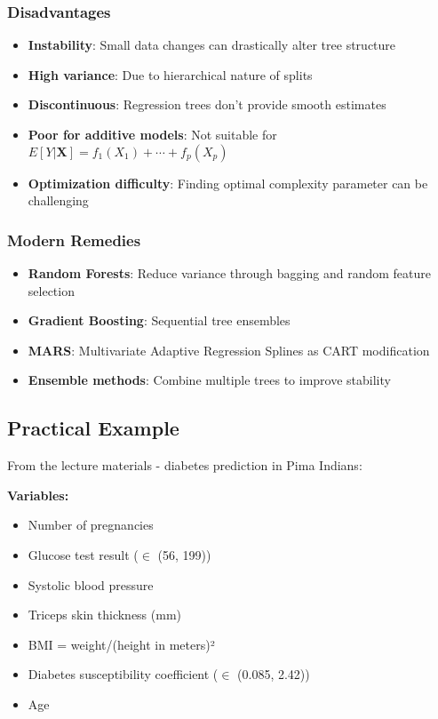 \documentclass[12pt,a4paper]{article}
\begin{document}
\subsubsection{Disadvantages}

\begin{itemize}
    \item \textbf{Instability}: Small data changes can drastically alter tree structure
    \item \textbf{High variance}: Due to hierarchical nature of splits
    \item \textbf{Discontinuous}: Regression trees don't provide smooth estimates
    \item \textbf{Poor for additive models}: Not suitable for $E[Y|\mathbf{X}] = f_1(X_1) + \cdots + f_p(X_p)$
    \item \textbf{Optimization difficulty}: Finding optimal complexity parameter can be challenging
\end{itemize}

\subsubsection{Modern Remedies}

\begin{itemize}
    \item \textbf{Random Forests}: Reduce variance through bagging and random feature selection
    \item \textbf{Gradient Boosting}: Sequential tree ensembles
    \item \textbf{MARS}: Multivariate Adaptive Regression Splines as CART modification
    \item \textbf{Ensemble methods}: Combine multiple trees to improve stability
\end{itemize}

\subsection{Practical Example}

From the lecture materials - diabetes prediction in Pima Indians:

\textbf{Variables:}
\begin{itemize}
    \item Number of pregnancies
    \item Glucose test result ($\in$ (56, 199))
    \item Systolic blood pressure
    \item Triceps skin thickness (mm)
    \item BMI = weight/(height in meters)²
    \item Diabetes susceptibility coefficient ($\in$ (0.085, 2.42))
    \item Age
\end{itemize}
\end{document}
